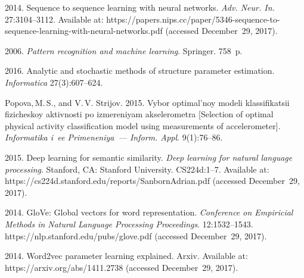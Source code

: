   \begin{multicols}{2}

\renewcommand{\bibname}{\protect\rmfamily References}

{\small\frenchspacing
 {%
 \begin{thebibliography}{99}
 
2014. Sequence to sequence learning with neural networks. 
\textit{Adv. Neur. In.} 27:3104--3112. 
Available at: {\sf 
https://papers.nips.cc/\linebreak paper/5346-sequence-to-sequence-learning-with-neural-networks.pdf} (accessed December~29, 2017).

 2006.
\textit{Pattern recognition and machine learning}. Springer. 758~p.

 2016. 
Analytic and stochastic methods of structure parameter estimation. 
\textit{Informatica} 27(3):607--624.
    
Popova,\,M.\,S., and V.\,V. Strijov. 2015. 
Vybor optimal'noy modeli klassifikatsii fizicheskoy aktivnosti po izmereniyam
akselerometra
[Selection of optimal physical activity classification model using measurements 
of accelerometer]. \textit{Informatika i~ee Primeneniya~--- Inform. Appl}. 9(1):76--86.
    
 2015.
Deep learning for semantic similarity. 
\textit{Deep learning for natural language processing}. 
Stanford, CA: Stanford University. CS224d:1--7. Available at: 
{\sf https://cs224d.\linebreak stanford.edu/reports/SanbornAdrian.pdf} (accessed December~29, 2017).
    
2014. GloVe: Global vectors for word representation. 
\textit{Conference on Empiricial Methods in Natural Language Processing Proceedings}. 
12:1532--1543.   {\sf https://nlp.stanford.\linebreak edu/pubs/glove.pdf}
(accessed December~29, 2017).

 2014. Word2vec parameter learning explained. 
{Arxiv}. Available at: {\sf 
https://arxiv.org/abs/1411.2738} (accessed December~29, 2017).


\end{thebibliography}}}
\end{multicols}
